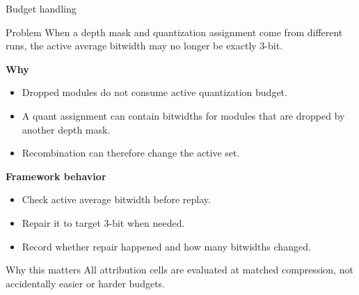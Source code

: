 \documentclass[aspectratio=169]{beamer}
\begin{document}
\begin{frame}{Budget handling}
\begin{block}{Problem}
When a depth mask and quantization assignment come from different runs, the active average bitwidth may no longer be exactly 3-bit.
\end{block}

\vspace{0.2cm}
\textbf{Why}
\begin{itemize}
    \item Dropped modules do not consume active quantization budget.
    \item A quant assignment can contain bitwidths for modules that are dropped by another depth mask.
    \item Recombination can therefore change the active set.
\end{itemize}

\vspace{0.2cm}
\textbf{Framework behavior}
\begin{itemize}
    \item Check active average bitwidth before replay.
    \item Repair it to target 3-bit when needed.
    \item Record whether repair happened and how many bitwidths changed.
\end{itemize}

\vspace{0.15cm}
\begin{block}{Why this matters}
All attribution cells are evaluated at matched compression, not accidentally easier or harder budgets.
\end{block}
\end{frame}

\end{document}
